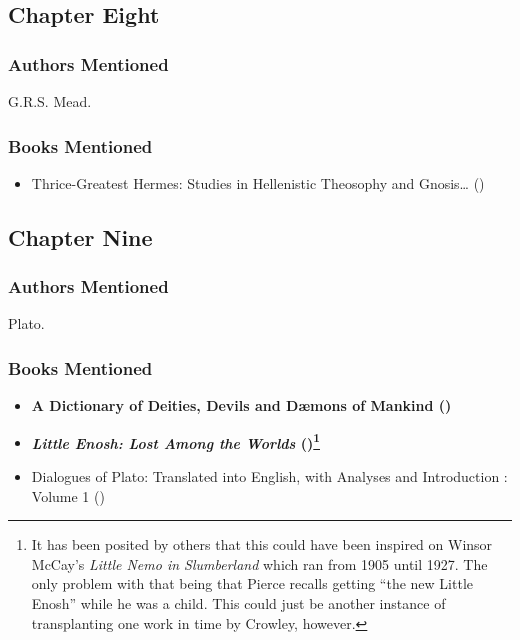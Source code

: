 \documentclass[
]{article}
\providecommand{\tightlist}{%
  \setlength{\itemsep}{0pt}\setlength{\parskip}{0pt}}
\begin{document}
\subsection{Chapter Eight}\label{chapter-eight-1}

\subsubsection{Authors Mentioned}\label{authors-mentioned-13}

G.R.S. Mead.

\subsubsection{Books Mentioned}\label{books-mentioned-14}

\begin{itemize}
\tightlist
\item
  Thrice-Greatest Hermes: Studies in Hellenistic Theosophy and
  Gnosis\ldots{} ()
\end{itemize}

\subsection{Chapter Nine}\label{chapter-nine}

\subsubsection{Authors Mentioned}\label{authors-mentioned-14}

Plato.

\subsubsection{Books Mentioned}\label{books-mentioned-15}

\begin{itemize}
\tightlist
\item
  \textbf{A Dictionary of Deities, Devils and Dæmons of Mankind
  ()}
\item
  \textbf{\emph{Little Enosh: Lost Among the Worlds}
  ()\footnote{It has been posited by others
    that this could have been inspired on Winsor McCay's \emph{Little
    Nemo in Slumberland} which ran from 1905 until 1927. The only
    problem with that being that Pierce recalls getting ``the new Little
    Enosh'' while he was a child. This could just be another instance of
    transplanting one work in time by Crowley, however.}}
\item
  Dialogues of Plato: Translated into English, with Analyses and
  Introduction : Volume 1 ()
\end{itemize}
\end{document}
